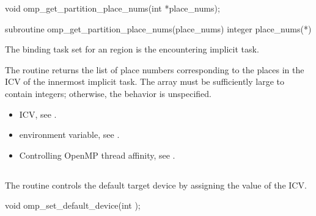 \format
\ccppspecificstart
\begin{boxedcode}
void omp\_get\_partition\_place\_nums(int *place\_nums);
\end{boxedcode}
\ccppspecificend

\fortranspecificstart
\begin{boxedcode}
subroutine omp\_get\_partition\_place\_nums(place\_nums)
integer place\_nums(*)
\end{boxedcode}
\fortranspecificend

\binding
The binding task set for an  region is the encountering implicit task.

\effect
The  routine returns the list of place numbers corresponding to the places in the  ICV of the innermost implicit task. The array must be sufficiently large to contain  integers; otherwise, the behavior is unspecified.

\crossreferences
\begin{itemize}
\item {} ICV, see 
.

\item {} environment variable, see 
.

\item Controlling OpenMP thread affinity, see 
. 
\end{itemize}





\subsection{}
\label{subsec:omp_set_default_device}

\summary

The  routine controls the default target device by 
assigning the value of the  ICV.

\format
\ccppspecificstart
\begin{boxedcode}
void omp\_set\_default\_device(int );
\end{boxedcode}
\ccppspecificend

